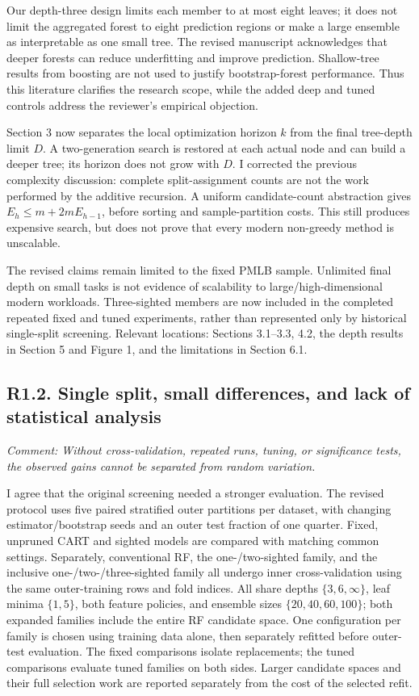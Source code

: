 \documentclass[11pt]{article}
\newcommand{\comment}[1]{\textit{Comment: #1}}
\begin{document}
Our depth-three design limits each member to at most eight leaves; it does not limit the aggregated forest to eight prediction regions or make a large ensemble as interpretable as one small tree. The revised manuscript acknowledges that deeper forests can reduce underfitting and improve prediction. Shallow-tree results from boosting are not used to justify bootstrap-forest performance. Thus this literature clarifies the research scope, while the added deep and tuned controls address the reviewer's empirical objection.

Section 3 now separates the local optimization horizon $k$ from the final tree-depth limit $D$. A two-generation search is restored at each actual node and can build a deeper tree; its horizon does not grow with $D$. I corrected the previous complexity discussion: complete split-assignment counts are not the work performed by the additive recursion. A uniform candidate-count abstraction gives $E_h\leq m+2mE_{h-1}$, before sorting and sample-partition costs. This still produces expensive search, but does not prove that every modern non-greedy method is unscalable.

The revised claims remain limited to the fixed PMLB sample. Unlimited final depth on small tasks is not evidence of scalability to large/high-dimensional modern workloads. Three-sighted members are now included in the completed repeated fixed and tuned experiments, rather than represented only by historical single-split screening. Relevant locations: Sections 3.1--3.3, 4.2, the depth results in Section 5 and Figure 1, and the limitations in Section 6.1.

\subsection*{R1.2. Single split, small differences, and lack of statistical analysis}
\comment{Without cross-validation, repeated runs, tuning, or significance tests, the observed gains cannot be separated from random variation.}

I agree that the original screening needed a stronger evaluation. The revised protocol uses five paired stratified outer partitions per dataset, with changing estimator/bootstrap seeds and an outer test fraction of one quarter. Fixed, unpruned CART and sighted models are compared with matching common settings. Separately, conventional RF, the one-/two-sighted family, and the inclusive one-/two-/three-sighted family all undergo inner cross-validation using the same outer-training rows and fold indices. All share depths $\{3,6,\infty\}$, leaf minima $\{1,5\}$, both feature policies, and ensemble sizes $\{20,40,60,100\}$; both expanded families include the entire RF candidate space. One configuration per family is chosen using training data alone, then separately refitted before outer-test evaluation. The fixed comparisons isolate replacements; the tuned comparisons evaluate tuned families on both sides. Larger candidate spaces and their full selection work are reported separately from the cost of the selected refit.
\end{document}

